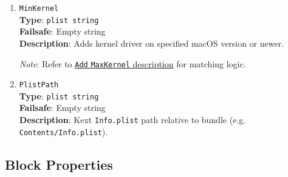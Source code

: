 \documentclass[]{article}
\begin{document}
\begin{enumerate}
\item
  \texttt{MinKernel}\\
  \textbf{Type}: \texttt{plist\ string}\\
  \textbf{Failsafe}: Empty string\\
  \textbf{Description}: Adds kernel driver on specified macOS version or newer.

  \emph{Note}: Refer to \hyperlink{kernmatch}{\texttt{Add} \texttt{MaxKernel} description} for matching logic.

\item
  \texttt{PlistPath}\\
  \textbf{Type}: \texttt{plist\ string}\\
  \textbf{Failsafe}: Empty string\\
  \textbf{Description}: Kext \texttt{Info.plist} path relative to bundle
  (e.g. \texttt{Contents/Info.plist}).

\end{enumerate}

\subsection{Block Properties}\label{kernelpropsblock}
\end{document}
